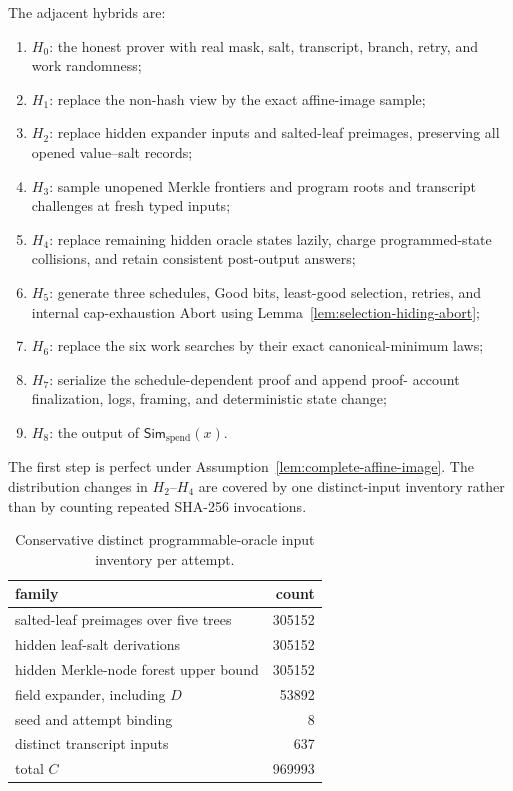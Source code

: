The adjacent hybrids are:
\begin{enumerate}
  \item \(H_0\): the honest prover with real mask, salt, transcript, branch,
        retry, and work randomness;
  \item \(H_1\): replace the non-hash view by the exact affine-image sample;
  \item \(H_2\): replace hidden expander inputs and salted-leaf preimages,
        preserving all opened value--salt records;
  \item \(H_3\): sample unopened Merkle frontiers and program roots and
        transcript challenges at fresh typed inputs;
  \item \(H_4\): replace remaining hidden oracle states lazily, charge
        programmed-state collisions, and retain consistent post-output
        answers;
  \item \(H_5\): generate three schedules, Good bits, least-good selection,
        retries, and internal cap-exhaustion Abort using
        Lemma~\ref{lem:selection-hiding-abort};
  \item \(H_6\): replace the six work searches by their exact
        canonical-minimum laws;
  \item \(H_7\): serialize the schedule-dependent proof and append proof-
        account finalization, logs, framing, and deterministic state change;
  \item \(H_8\): the output of \(\mathsf{Sim}_{\mathrm{spend}}(x)\).
\end{enumerate}
The first step is perfect under
Assumption~\ref{lem:complete-affine-image}.  The
distribution changes in \(H_2\)--\(H_4\) are covered by one distinct-input
inventory rather than by counting repeated SHA-256 invocations.

\begin{table}[t]
\centering
\caption{Conservative distinct programmable-oracle input inventory per
attempt.}
\label{tab:epro-inventory}
\begin{tabular}{@{}lr@{}}
\toprule
family & count \\
\midrule
salted-leaf preimages over five trees & 305152 \\
hidden leaf-salt derivations & 305152 \\
hidden Merkle-node forest upper bound & 305152 \\
field expander, including \(D\) & 53892 \\
seed and attempt binding & 8 \\
distinct transcript inputs & 637 \\
\midrule
total \(C\) & 969993 \\
\bottomrule
\end{tabular}
\end{table}

